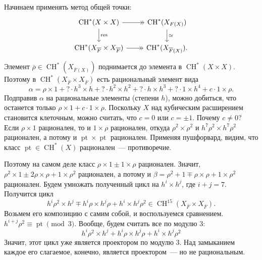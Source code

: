 \documentclass[a4paper]{article}
\DeclareMathOperator{\CH}{CH}
\DeclareMathOperator{\pt}{pt}
\DeclareMathOperator{\res}{res}
\newcommand{\isom}{\simeq}
\theoremstyle{definition}
\newcommand{\ol}{\overline}
\begin{document}
Начинаем применять метод общей точки:
\[
\begin{tikzcd}
\CH^*(X\times X) \arrow[->>]{r} \arrow{d}{\res} &
\CH^*(X_{F(X)}) \arrow{d}{\isom} \\
\CH^*(X_{\ol{F}}\times X_{\ol{F}}) \arrow[->>]{r} &
\CH^*(X_{\ol{F}(X)}).
\end{tikzcd}
\]
Элемент $\ol{\rho}\in\CH^*(X_{\ol{F}(X)})$ поднимается
до элемента в $\CH^*(X\times X)$.
Поэтому в $\CH^*(X_{\ol{F}}\times X_{\ol{F}})$ есть
рациональный элемент вида
\[
\alpha = \rho\times 1 + ? \cdot h^3\times h
+ ?\cdot h^2\times h^2 + ?\cdot h\times h^3
+ ?\cdot 1\times h^4 + c\cdot 1\times \rho.
\]
Подправив $\alpha$ на рациональные элементы (степени $h$),
можно добиться, что останется только
$\rho\times 1 + c\cdot 1\times\rho$.
Поскольку $X$ над кубическим расширением становится клеточным,
можно считать, что $c = 0$ или $c = \pm 1$.
Почему $c\neq 0$?
Если $\rho\times 1$ рационален, то и $1\times\rho$ рационален,
откуда $\rho^2\times\rho^2$ и $h^7\rho^2\times h^7\rho^2$
рационален, а потому и $\pt\times\pt$ рационален.
Применяя пушфорвард, видим, что класс
$\pt\in\CH^*(X)$ рационален~--- противоречие.

Поэтому на самом деле класс $\rho\times 1\pm 1\times\rho$
рационален.
Значит, $\rho^2\times 1 \pm 2\rho\times\rho + 1\times\rho^2$
рационален, а потому и
$\beta = \rho^2 + 1 \mp \rho\times\rho + 1\times\rho^2$
рационален.
Будем умножать полученный цикл на $h^i\times h^j$,
где $i+j=7$.
Получится цикл
\[
h^i\rho^2\times h^j \mp h^i\rho\times h^j\rho
+h^i\times h^j\rho^2\in\CH^{15}(X_{\ol{F}}\times X_{\ol{F}}).
\]
Возьмем его композицию с самим собой, и воспользуемся сравнением.
$h^{i+j}\rho^2 \equiv \pt \pmod{3}$.
Вообще, будем считать все по модулю $3$:
\[
h^i\rho^2\times h^j + h^i\rho\times h^j\rho + h^i\times h^j\rho^2
\]
Значит, этот цикл уже является проектором по модулю $3$.
Над замыканием каждое его слагаемое, конечно, является проектором~---
но не рациональным.
\end{document}
